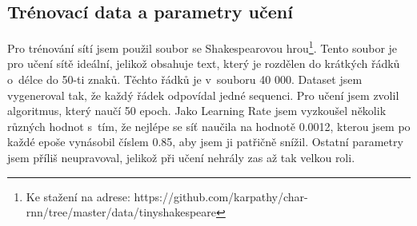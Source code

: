 \documentclass[a4paper]{article}
\begin{document}
\subsection{Trénovací data a parametry učení}
Pro trénování sítí jsem použil soubor se Shakespearovou hrou\footnote{Ke stažení na adrese: https://github.com/karpathy/char-rnn/tree/master/data/tinyshakespeare}. Tento soubor je pro učení sítě ideální, jelikož obsahuje text, který je rozdělen do krátkých řádků o~délce do 50-ti znaků. Těchto řádků je v~souboru 40 000. Dataset jsem vygeneroval tak, že každý řádek odpovídal jedné sequenci. Pro učení jsem zvolil algoritmus, který naučí 50 epoch. Jako Learning Rate jsem vyzkoušel několik různých hodnot s~tím, že nejlépe se síť naučila na hodnotě 0.0012, kterou jsem po každé epoše vynásobil číslem 0.85, aby jsem ji patřičně snížil. Ostatní parametry jsem příliš neupravoval, jelikož při učení nehrály zas až tak velkou roli.
\end{document}
